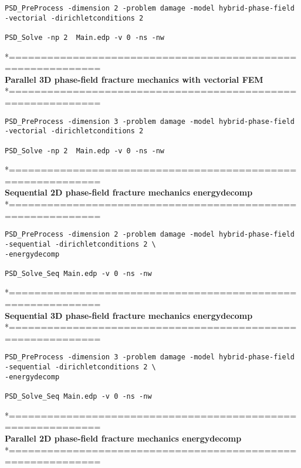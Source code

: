 \begin{lstlisting}[style=BashInputStyle]
PSD_PreProcess -dimension 2 -problem damage -model hybrid-phase-field -vectorial -dirichletconditions 2   

PSD_Solve -np 2  Main.edp -v 0 -ns -nw   
\end{lstlisting}
*============================================================\\
\textbf{ Parallel 3D phase-field fracture mechanics  with vectorial FEM} \\
*============================================================\\
\begin{lstlisting}[style=BashInputStyle]
PSD_PreProcess -dimension 3 -problem damage -model hybrid-phase-field -vectorial -dirichletconditions 2   

PSD_Solve -np 2  Main.edp -v 0 -ns -nw   
\end{lstlisting}
*============================================================\\
\textbf{ Sequential 2D  phase-field fracture mechanics energydecomp }\\
*============================================================\\
\begin{lstlisting}[style=BashInputStyle]
PSD_PreProcess -dimension 2 -problem damage -model hybrid-phase-field -sequential -dirichletconditions 2 \
-energydecomp   

PSD_Solve_Seq Main.edp -v 0 -ns -nw   
\end{lstlisting}
*============================================================\\
\textbf{ Sequential 3D phase-field fracture mechanics energydecomp }\\
*============================================================\\
\begin{lstlisting}[style=BashInputStyle]
PSD_PreProcess -dimension 3 -problem damage -model hybrid-phase-field -sequential -dirichletconditions 2 \
-energydecomp   

PSD_Solve_Seq Main.edp -v 0 -ns -nw   
\end{lstlisting}
*============================================================\\
\textbf{ Parallel 2D phase-field fracture mechanics energydecomp }\\
*============================================================\\
